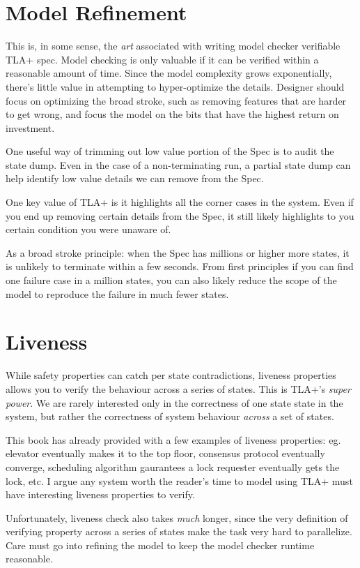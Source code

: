 \section{Model Refinement}

This is, in some sense, the \textit{art} associated with writing model checker
verifiable TLA+ spec. Model checking is only valuable if it can be verified
within a reasonable amount of time. Since the model complexity grows
exponentially, there's little value in attempting to hyper-optimize the details.
Designer should focus on optimizing the broad stroke, such as removing features 
that are harder to get wrong, and focus the model on the bits that have the
highest return on investment.\newline

One useful way of trimming out low value portion of the Spec is to audit the
state dump. Even in the case of a non-terminating run, a partial state dump can
help identify low value details we can remove from the Spec.\newline

One key value of TLA+ is it highlights all the corner cases in the system. Even
if you end up removing certain details from the Spec, it still likely highlights
to you certain condition you were unaware of.\newline

As a broad stroke principle: when the Spec has millions or higher more states,
it is unlikely to terminate within a few seconds. From first principles if you
can find one failure case in a million states, you can also likely reduce the 
scope of the model to reproduce the failure in much fewer states.

\section{Liveness}

While safety properties can catch per state contradictions, liveness properties
allows you to verify the behaviour across a series of states. This is TLA+'s
\textit{super power}. We are rarely interested only in the correctness of one
state state in the system, but rather the correctness of system behaviour
\textit{across} a set of states. \newline

This book has already provided with a few examples of liveness properties: eg.
elevator eventually makes it to the top floor, consensus protocol eventually
converge, scheduling algorithm gaurantees a lock requester eventually gets the
lock, etc. I argue any system worth the reader's time to model using TLA+ must 
have interesting liveness properties to verify.\newline

Unfortunately, liveness check also takes \textit{much} longer, since the very
definition of verifying property across a series of states make the task very
hard to parallelize. Care must go into refining the model to keep the model
checker runtime reasonable.